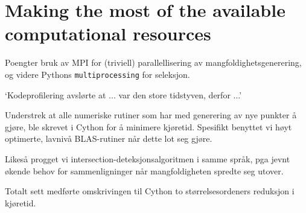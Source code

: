 \section{Making the most of the available computational resources}
\label{sec:making_the_most_of_the_available_computational_resources}

\begin{framed}
    Poengter bruk av MPI for (triviell) parallellisering av mangfoldighetsgenerering,
    og videre Pythons \texttt{multiprocessing} for seleksjon.

    `Kodeprofilering avslørte at ... var den store tidstyven, derfor ...'

    Understrek at alle numeriske rutiner som har med generering av nye punkter å
    gjøre, ble skrevet i Cython for å minimere kjøretid. Spesifikt
    benyttet vi høyt optimerte, lavnivå BLAS-rutiner når dette lot seg gjøre.

    Likeså progget vi intersection-deteksjonsalgoritmen i samme språk,
    pga jevnt økende behov for sammenligninger når mangfoldigheten spredte seg
    utover.

    Totalt sett medførte omskrivingen til Cython to størrelsesordeners reduksjon
    i kjøretid.
\end{framed}
